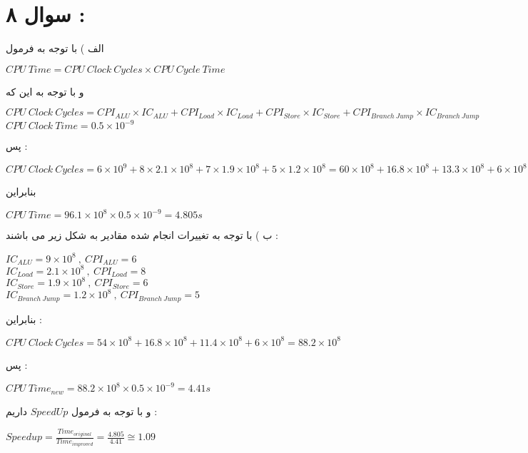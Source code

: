 \documentclass{article}
\begin{document}
\section*{سوال ۸  : }
الف ‌) با توجه به فرمول 
\begin{center}
	$ CPU \ Time = CPU \ Clock \ Cycles \times CPU \ Cycle \ Time $
\end{center}
و با توجه به این که 
\begin{center}
	$ CPU  \ Clock \ Cycles = CPI_{ALU} \times IC_{ALU} + CPI_{Load} \times IC_{Load} + CPI_{Store} \times IC_{Store} + CPI_{Branch \ Jump } \times IC_{Branch \ Jump }$ \\
	$ CPU \ Clock \ Time  = 0.5 \times 10^{-9}$
\end{center}
پس  : 
\begin{center}
	$ CPU \ Clock  \ Cycles = 6 \times 10^{9} + 8 \times 2.1 \times 10^8 + 7 \times 1.9 \times 10 ^8 + 5 \times 1.2 \times 10^8 = 60 \times 10 ^8 + 16.8 \times 10^8 + 13.3 \times 10^8 + 6 \times 10^8 = 96.1 \times 10^8$
\end{center}
بنابراین 
\begin{center}
	$CPU \ Time  = 96.1 \times 10 ^8 \times 0.5 \times 10^{-9} = 4.805s$
 \end{center}

ب ) با توجه به تغییرات انجام شده مقادیر به شکل زیر می باشند  : 
\begin{center}
	$IC_{ALU} = 9 \times 10^8 \ , \ 
	CPI_{ALU} = 6  $\\
	$ IC_{Load} = 2.1 \times 10^8 \ , \ 
	CPI_{Load} = 8$\\
	$ IC_{Store} = 1.9 \times 10^8 \ , \ 
	CPI_{Store} = 6$\\
	$IC_{Branch  \ Jump} = 1.2 \times 10^8 \ , \ 
	CPI_{Branch \ Jump} = 5 $
\end{center}
بنابراین  : 
\begin{center}
	$ CPU \ Clock \ Cycles = 54 \times 10^8 + 16.8 \times 10^8 + 11.4 \times 10^8  + 6 \times 10^8 = 88.2 \times 10^8$
\end{center}
پس  : 
\begin{center}
	$ CPU \ Time_{new}  = 88.2 \times 10^8 \times 0.5 \times 10^{-9} = 4.41s$
\end{center}
و با توجه به فرمول 
$SpeedUp$
داریم  : 
\begin{center}
	$Speedup = \frac{Time_{original} }{Time _{improved}} = \frac{4.805}{4.41} \cong 1.09$
\end{center}
\end{document}
